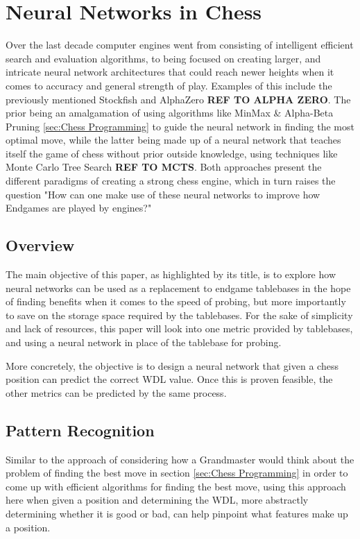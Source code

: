 \section{Neural Networks in Chess}
\label{sec:NeuralNets}

Over the last decade computer engines went from consisting of intelligent efficient search and evaluation algorithms, to being focused on creating larger, and intricate neural network architectures that could reach newer heights when it comes to accuracy and general strength of play. Examples of this include the previously mentioned Stockfish \cite{stockfish2024} and AlphaZero \textbf{REF TO ALPHA ZERO}. The prior being an amalgamation of using algorithms like MinMax \& Alpha-Beta Pruning \ref{sec:Chess Programming} to guide the neural network in finding the most optimal move, while the latter being made up of a neural network that teaches itself the game of chess without prior outside knowledge, using techniques like Monte Carlo Tree Search \textbf{REF TO MCTS}. Both approaches present the different paradigms of creating a strong chess engine, which in turn raises the question "How can one make use of these neural networks to improve how Endgames are played by engines?"

\subsection{Overview}
The main objective of this paper, as highlighted by its title, is to explore how neural networks can be used as a replacement to endgame tablebases in the hope of finding benefits when it comes to the speed of probing, but more importantly to save on the storage space required by the tablebases. For the sake of simplicity and lack of resources, this paper will look into one metric provided by tablebases, and using a neural network in place of the tablebase for probing.

More concretely, the objective is to design a neural network that given a chess position can predict the correct WDL value. Once this is proven feasible, the other metrics can be predicted by the same process. 

\subsection{Pattern Recognition}
\label{subsec:PattRec}
Similar to the approach of considering how a Grandmaster would think about the problem of finding the best move in section \ref{sec:Chess Programming} in order to come up with efficient algorithms for finding the best move, using this approach here when given a position and determining the WDL, more abstractly determining whether it is good or bad, can help pinpoint what features make up a position.

